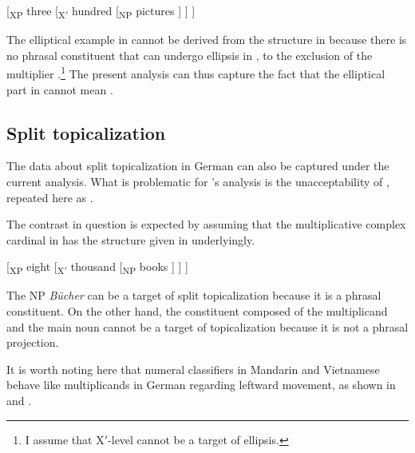 \documentclass[output=paper]{langscibook}
\begin{document}
\ea\label{tat:eli.st}
{[}\textsubscript{XP} three [\textsubscript{X$'$} hundred [\textsubscript{NP} pictures ] ] ]
\z

\noindent The elliptical example in  cannot be derived from the structure in  because there is no phrasal constituent that can undergo ellipsis in , to the exclusion of the multiplier .\footnote{I assume that X$'$-level cannot be a target of ellipsis.} The present analysis can thus capture the fact that the elliptical part in  cannot mean .

\subsection{Split topicalization}\label{tat:sec:top.prop}
The data about split topicalization in German can also be captured under the current analysis. What is problematic for \citeauthor{IoninMatushansky2018}'s analysis is the unacceptability of , repeated here as .

 \z

The contrast in question is expected by assuming that the multiplicative complex cardinal in  has the structure given in  underlyingly.

\ea\label{tat:top.st}
{[}\textsubscript{XP} eight [\textsubscript{X$'$} thousand [\textsubscript{NP} books ] ] ]
\z

\noindent The NP \textit{B\"{u}cher} can be a target of split topicalization because it is a phrasal constituent. On the other hand, the constituent composed of the multiplicand and the main noun cannot be a target of topicalization because it is not a phrasal projection.

It is worth noting here that numeral classifiers in Mandarin and Vietnamese behave like multiplicands in German regarding leftward movement, as shown in  and .

\ea\label{tat:chi.top}
\end{document}
